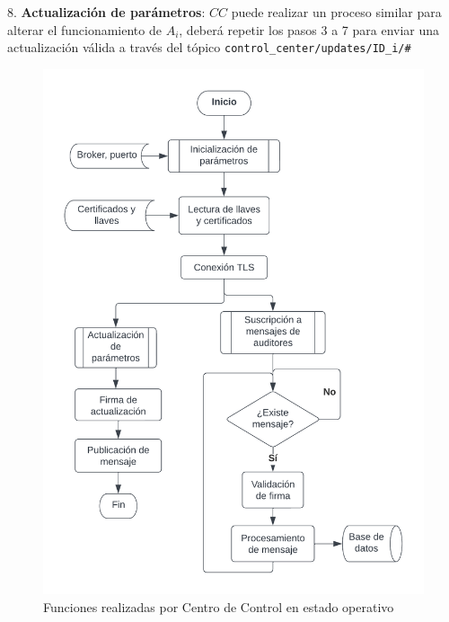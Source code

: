 \documentclass{article}
\begin{document}
            8. \textbf{Actualización de parámetros}: $CC$ puede realizar un proceso similar para alterar el funcionamiento de $A_i$, deberá repetir los pasos 3 a 7 para enviar una actualización válida a través del tópico \texttt{control\_center/updates/ID\_i/\#}

            \begin{figure}[!htbp]
                \centering
                \begin{minipage}{0.4\textwidth}
                    \centering
                    \includegraphics[scale=0.55]{proceso_centro_control.png}
                    \caption{Funciones realizadas por Centro de Control en estado operativo}
                    \label{fig:cc_process_flow}
                \end{minipage}
                \begin{minipage}{0.4\textwidth}
                    \centering

\end{minipage}
\end{figure}
\end{document}
